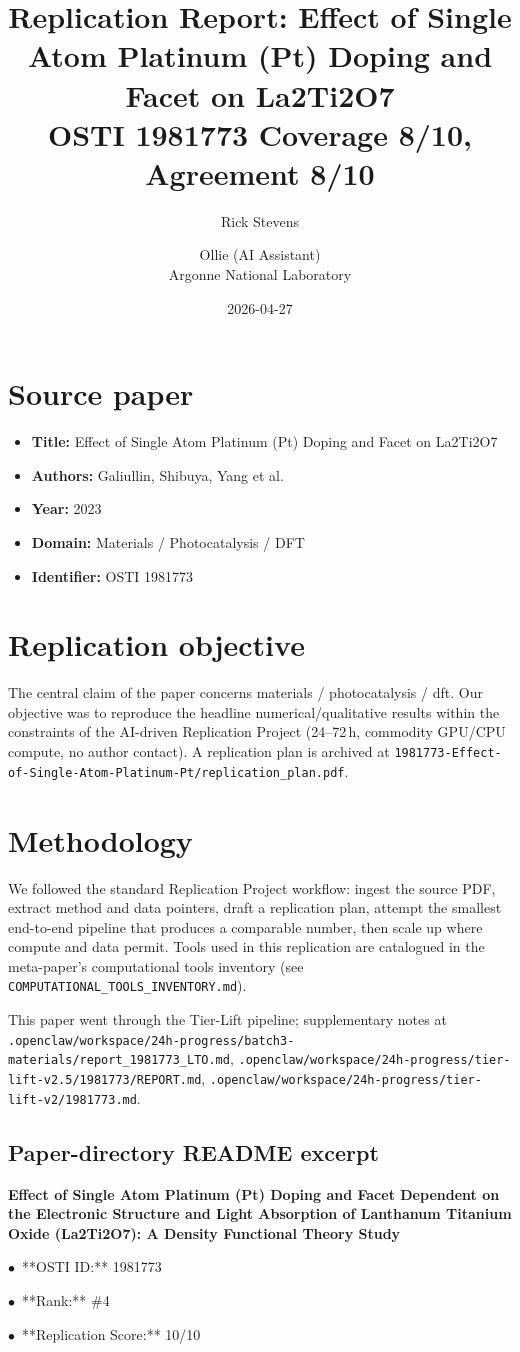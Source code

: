 \documentclass[11pt]{article}
\title{Replication Report: Effect of Single Atom Platinum (Pt) Doping and Facet on La2Ti2O7\\[2pt]\large OSTI 1981773 \textbar{} Coverage 8/10, Agreement 8/10}
\author{Rick Stevens \and Ollie (AI Assistant)\\\small Argonne National Laboratory}
\date{2026-04-27}
\begin{document}
\maketitle

\section{Source paper}
\begin{itemize}
\item \textbf{Title:} Effect of Single Atom Platinum (Pt) Doping and Facet on La2Ti2O7
\item \textbf{Authors:} Galiullin, Shibuya, Yang et al.
\item \textbf{Year:} 2023
\item \textbf{Domain:} Materials / Photocatalysis / DFT
\item \textbf{Identifier:} OSTI 1981773
\end{itemize}


\section{Replication objective}
The central claim of the paper concerns materials / photocatalysis / dft. Our objective was to reproduce the headline numerical/qualitative results within the constraints of the AI-driven Replication Project (24--72\,h, commodity GPU/CPU compute, no author contact). A replication plan is archived at \texttt{1981773-Effect-of-Single-Atom-Platinum-Pt/replication\_plan.pdf}.

\section{Methodology}
We followed the standard Replication Project workflow: ingest the source PDF, extract method and data pointers, draft a replication plan, attempt the smallest end-to-end pipeline that produces a comparable number, then scale up where compute and data permit. Tools used in this replication are catalogued in the meta-paper's computational tools inventory (see \texttt{COMPUTATIONAL\_TOOLS\_INVENTORY.md}).

This paper went through the Tier-Lift pipeline; supplementary notes at \texttt{.openclaw/workspace/24h-progress/batch3-materials/report\_1981773\_LTO.md}, \texttt{.openclaw/workspace/24h-progress/tier-lift-v2.5/1981773/REPORT.md}, \texttt{.openclaw/workspace/24h-progress/tier-lift-v2/1981773.md}.

\subsection*{Paper-directory README excerpt}
\small
\par\medskip\textbf{Effect of Single Atom Platinum (Pt) Doping and Facet Dependent on the Electronic Structure and Light Absorption of Lanthanum Titanium Oxide (La2Ti2O7): A Density Functional Theory Study}\par
\par$\bullet$\ **OSTI ID:** 1981773
\par$\bullet$\ **Rank:** \#4
\par$\bullet$\ **Replication Score:** 10/10
\end{document}
